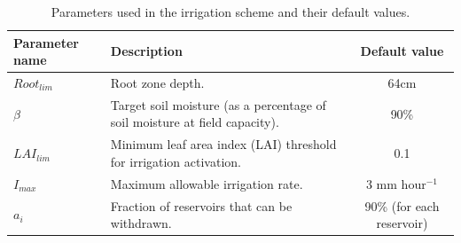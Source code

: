 \begin{table}[htbp]
    \centering
    \begin{tabular}{|l|p{7cm}|c|}
        \hline
        \textbf{Parameter name} & \textbf{Description} & \textbf{Default value} \\
        \hline
        $Root_{lim}$ & Root zone depth. & 64cm \\ %
        \hline
        $\beta$ & Target soil moisture (as a percentage of soil moisture at field capacity). & 90\% \\%
        \hline
        $LAI_{lim}$ & Minimum leaf area index (LAI) threshold for irrigation activation. & 0.1 \\ %
        \hline
        $I_{max}$ & Maximum allowable irrigation rate. & 3 mm hour$^{-1}$ \\ %
        \hline
        $a_i$ & Fraction of reservoirs that can be withdrawn. & 90\%  (for each reservoir)\\ %
        \hline
    \end{tabular}
    \caption{Parameters used in the irrigation scheme and their default values.}
    \label{tab:irrigation_parameters}
\end{table}

